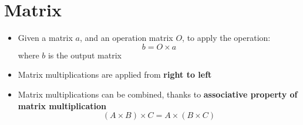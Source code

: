 \chapter{Matrix}

\begin{itemize}
  \item Given a matrix $ a $, and an operation matrix $ O $, to apply
  the operation:
  \begin{equation}
    b = O \times a
  \end{equation}
  where $ b $ is the output matrix

  \item Matrix multiplications are applied from \textbf{right to left}
  \item Matrix multiplications can be combined, thanks to \textbf{associative
  property of matrix multiplication}
  \begin{equation}
    \left( A \times B \right) \times C = A \times \left( B \times C \right)
  \end{equation}
\end{itemize}
